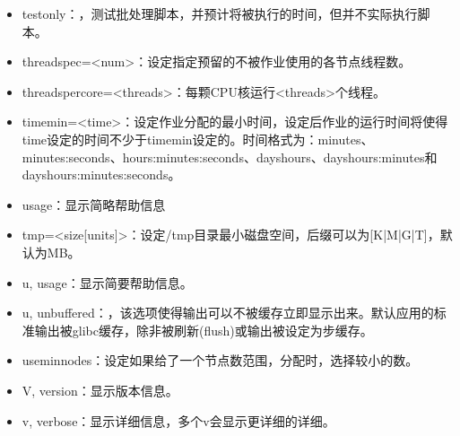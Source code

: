 \documentclass[a4paper,12pt,english]{sphinxmanual}
\begin{document}
\begin{itemize}
\item {} 
\sphinxAtStartPar
\sphinxhyphen{}\sphinxhyphen{}test\sphinxhyphen{}only：，测试批处理脚本，并预计将被执行的时间，但并不实际执行脚本。

\item {} 
\sphinxAtStartPar
\sphinxhyphen{}\sphinxhyphen{}thread\sphinxhyphen{}spec=<num>：设定指定预留的不被作业使用的各节点线程数。

\item {} 
\sphinxAtStartPar
\sphinxhyphen{}\sphinxhyphen{}threads\sphinxhyphen{}per\sphinxhyphen{}core=<threads>：每颗CPU核运行<threads>个线程。

\item {} 
\sphinxAtStartPar
\sphinxhyphen{}\sphinxhyphen{}time\sphinxhyphen{}min=<time>：设定作业分配的最小时间，设定后作业的运行时间将使得\sphinxhyphen{}\sphinxhyphen{}time设定的时间不少于\sphinxhyphen{}\sphinxhyphen{}time\sphinxhyphen{}min设定的。时间格式为：minutes、minutes:seconds、hours:minutes:seconds、days\sphinxhyphen{}hours、days\sphinxhyphen{}hours:minutes和days\sphinxhyphen{}hours:minutes:seconds。

\item {} 
\sphinxAtStartPar
\sphinxhyphen{}\sphinxhyphen{}usage：显示简略帮助信息

\item {} 
\sphinxAtStartPar
\sphinxhyphen{}\sphinxhyphen{}tmp=<size{[}units{]}>：设定/tmp目录最小磁盘空间，后缀可以为{[}K|M|G|T{]}，默认为MB。

\item {} 
\sphinxAtStartPar
\sphinxhyphen{}u, \sphinxhyphen{}\sphinxhyphen{}usage：显示简要帮助信息。

\item {} 
\sphinxAtStartPar
\sphinxhyphen{}u, \sphinxhyphen{}\sphinxhyphen{}unbuffered：，该选项使得输出可以不被缓存立即显示出来。默认应用的标准输出被glibc缓存，除非被刷新(flush)或输出被设定为步缓存。

\item {} 
\sphinxAtStartPar
\sphinxhyphen{}\sphinxhyphen{}use\sphinxhyphen{}min\sphinxhyphen{}nodes：设定如果给了一个节点数范围，分配时，选择较小的数。

\item {} 
\sphinxAtStartPar
\sphinxhyphen{}V, \sphinxhyphen{}\sphinxhyphen{}version：显示版本信息。

\item {} 
\sphinxAtStartPar
\sphinxhyphen{}v, \sphinxhyphen{}\sphinxhyphen{}verbose：显示详细信息，多个v会显示更详细的详细。


\end{itemize}
\end{document}
